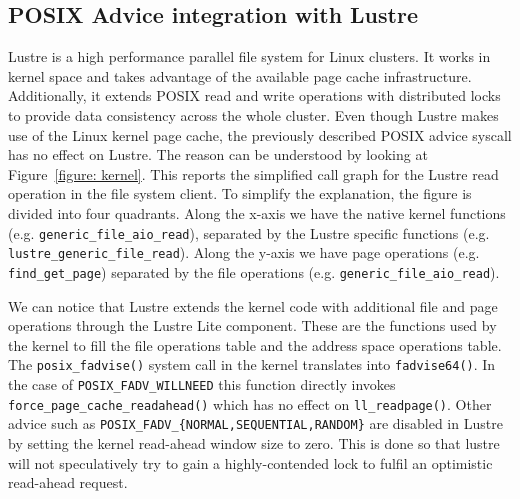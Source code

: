 \subsection{POSIX Advice integration with Lustre}
\label{subsec: posix_advice_lustre}
Lustre is a high performance parallel file system for Linux clusters. It works in kernel space and takes advantage of the available page cache infrastructure. Additionally, it extends POSIX read and write operations with distributed locks to provide data consistency across the whole cluster. Even though Lustre makes use of the Linux kernel page cache, the previously described POSIX advice syscall has no effect on Lustre. The reason can be understood by looking at Figure~\ref{figure: kernel}. This reports the simplified call graph for the Lustre read operation in the file system client. To simplify the explanation, the figure is divided into four quadrants. Along the x-axis we have the native kernel functions (e.g. \texttt{generic\_file\_aio\_read}), separated by the Lustre specific functions (e.g. \texttt{lustre\_generic\_file\_read}). Along the y-axis we have page operations (e.g. \texttt{find\_get\_page}) separated by the file operations (e.g. \texttt{generic\_file\_aio\_read}). 

We can notice that Lustre extends the kernel code with additional file and page operations through the Lustre Lite component. These are the functions used by the kernel to fill the file operations table and the address space operations table. The \texttt{posix\_fadvise()} system call in the kernel translates into \texttt{fadvise64()}. In the case of \texttt{POSIX\_FADV\_WILLNEED} this function directly invokes \texttt{force\_page\_cache\_readahead()} which has no effect on \texttt{ll\_readpage()}. Other advice such as \texttt{POSIX\_FADV\_\{NORMAL,SEQUENTIAL,RANDOM\}} are disabled in Lustre by setting the kernel read-ahead window size to zero. This is done so that lustre will not speculatively try to gain a highly-contended lock to fulfil an optimistic read-ahead request.

